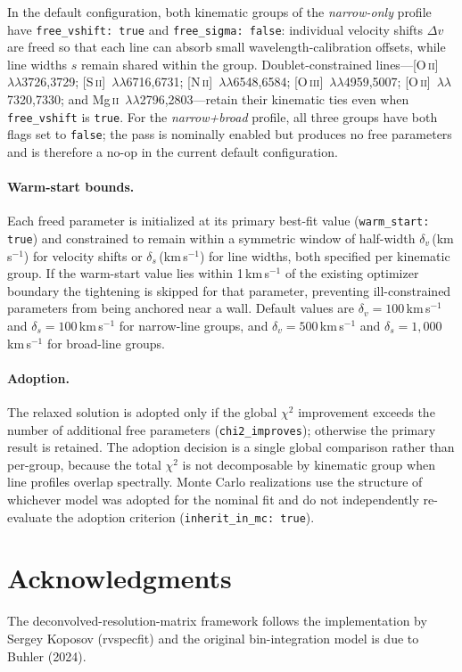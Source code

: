 \documentclass[12pt]{article}
\begin{document}
In the default configuration, both kinematic groups of the \emph{narrow-only} profile
have \texttt{free\_vshift: true} and \texttt{free\_sigma: false}: individual velocity
shifts $\Delta v$ are freed so that each line can absorb small wavelength-calibration
offsets, while line widths $s$ remain shared within the group.  Doublet-constrained
lines---[O\,\textsc{ii}]~$\lambda\lambda$3726,3729;
[S\,\textsc{ii}]~$\lambda\lambda$6716,6731;
[N\,\textsc{ii}]~$\lambda\lambda$6548,6584;
[O\,\textsc{iii}]~$\lambda\lambda$4959,5007;
[O\,\textsc{ii}]~$\lambda\lambda$7320,7330;
and Mg\,\textsc{ii}~$\lambda\lambda$2796,2803---retain their kinematic ties even when
\texttt{free\_vshift} is \texttt{true}.  For the \emph{narrow+broad} profile, all three
groups have both flags set to \texttt{false}; the pass is nominally enabled but produces
no free parameters and is therefore a no-op in the current default configuration.

\paragraph{Warm-start bounds.}
Each freed parameter is initialized at its primary best-fit value (\texttt{warm\_start:
true}) and constrained to remain within a symmetric window of half-width
$\delta_v$\,(km\,s$^{-1}$) for velocity shifts or $\delta_s$\,(km\,s$^{-1}$) for
line widths, both specified per kinematic group.  If the warm-start value lies within
1\,km\,s$^{-1}$ of the existing optimizer boundary the tightening is skipped for that
parameter, preventing ill-constrained parameters from being anchored near a wall.
Default values are $\delta_v = 100$\,km\,s$^{-1}$ and $\delta_s = 100$\,km\,s$^{-1}$
for narrow-line groups, and $\delta_v = 500$\,km\,s$^{-1}$ and
$\delta_s = 1{,}000$\,km\,s$^{-1}$ for broad-line groups.

\paragraph{Adoption.}
The relaxed solution is adopted only if the global $\chi^2$ improvement exceeds the
number of additional free parameters (\texttt{chi2\_improves}); otherwise the primary
result is retained.  The adoption decision is a single global comparison rather than
per-group, because the total $\chi^2$ is not decomposable by kinematic group when line
profiles overlap spectrally.  Monte Carlo realizations use the structure of whichever
model was adopted for the nominal fit and do not independently re-evaluate the adoption
criterion (\texttt{inherit\_in\_mc: true}).


\section*{Acknowledgments}

The deconvolved-resolution-matrix framework follows the implementation
by Sergey Koposov (rvspecfit) and the original bin-integration model
is due to Buhler (2024).
\end{document}
